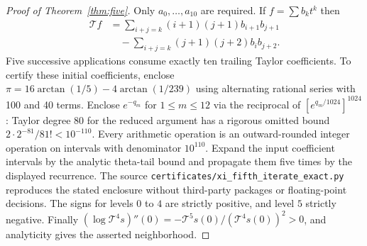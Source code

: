 \begin{proof}[Proof of Theorem~\ref{thm:five}]
Only $a_0,\ldots,a_{10}$ are required. If $f=\sum b_kt^k$ then
\begin{align*}
[t^k]\mathcal Tf
&=\sum_{i+j=k}(i+1)(j+1)b_{i+1}b_{j+1}\\
&\quad-\sum_{i+j=k}(j+1)(j+2)b_ib_{j+2}.
\end{align*}
Five successive applications consume exactly ten trailing Taylor
coefficients. To certify these initial coefficients, enclose
$\pi=16\arctan(1/5)-4\arctan(1/239)$ using alternating rational
series with 100 and 40 terms. Enclose $e^{-q_m}$ for $1\le m\le12$
via the reciprocal of $[e^{q_m/1024}]^{1024}$: Taylor degree 80
for the reduced argument has a rigorous omitted bound
$2\cdot2^{-81}/81!<10^{-110}$.
Every arithmetic operation is an outward-rounded integer
operation on intervals with denominator $10^{110}$. Expand
the input coefficient intervals by the analytic theta-tail bound
and propagate them five times by the displayed recurrence.
The source \texttt{certificates/xi\_fifth\_iterate\_exact.py}
reproduces the stated enclosure without third-party packages
or floating-point decisions. The signs for levels $0$ to $4$ are
strictly positive, and level $5$ strictly negative.
Finally $(\log\mathcal T^4s)''(0)
=-\mathcal T^5s(0)/(\mathcal T^4s(0))^2>0$, and analyticity
gives the asserted neighborhood.
\end{proof}
